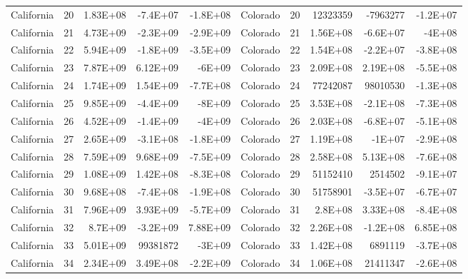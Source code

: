 \begin{landscape}
\begin{singlespace}
\begin{longtable}{lrrrr|lrrrr}
		California &  20 & 1.83E+08 & -7.4E+07 & -1.8E+08 & Colorado &  20 & 12323359 & -7963277 & -1.2E+07 \\
		California &  21 & 4.73E+09 & -2.3E+09 & -2.9E+09 & Colorado &  21 & 1.56E+08 & -6.6E+07 & -4E+08 \\
		California &  22 & 5.94E+09 & -1.8E+09 & -3.5E+09 & Colorado &  22 & 1.54E+08 & -2.2E+07 & -3.8E+08 \\
		California &  23 & 7.87E+09 & 6.12E+09 & -6E+09 & Colorado &  23 & 2.09E+08 & 2.19E+08 & -5.5E+08 \\
		California &  24 & 1.74E+09 & 1.54E+09 & -7.7E+08 & Colorado &  24 & 77242087 & 98010530 & -1.3E+08 \\
		California &  25 & 9.85E+09 & -4.4E+09 & -8E+09 & Colorado &  25 & 3.53E+08 & -2.1E+08 & -7.3E+08 \\
		California &  26 & 4.52E+09 & -1.4E+09 & -4E+09 & Colorado &  26 & 2.03E+08 & -6.8E+07 & -5.1E+08 \\
		California &  27 & 2.65E+09 & -3.1E+08 & -1.8E+09 & Colorado &  27 & 1.19E+08 & -1E+07 & -2.9E+08 \\
		California &  28 & 7.59E+09 & 9.68E+09 & -7.5E+09 & Colorado &  28 & 2.58E+08 & 5.13E+08 & -7.6E+08 \\
		California &  29 & 1.08E+09 & 1.42E+08 & -8.3E+08 & Colorado &  29 & 51152410 & 2514502 & -9.1E+07 \\
		California &  30 & 9.68E+08 & -7.4E+08 & -1.9E+08 & Colorado &  30 & 51758901 & -3.5E+07 & -6.7E+07 \\
		California &  31 & 7.96E+09 & 3.93E+09 & -5.7E+09 & Colorado &  31 & 2.8E+08 & 3.33E+08 & -8.4E+08 \\
		California &  32 & 8.7E+09 & -3.2E+09 & 7.88E+09 & Colorado &  32 & 2.26E+08 & -1.2E+08 & 6.85E+08 \\
		California &  33 & 5.01E+09 & 99381872 & -3E+09 & Colorado &  33 & 1.42E+08 & 6891119 & -3.7E+08 \\
		California &  34 & 2.34E+09 & 3.49E+08 & -2.2E+09 & Colorado &  34 & 1.06E+08 & 21411347 & -2.6E+08\\


\end{longtable}
\end{singlespace}
\end{landscape}
